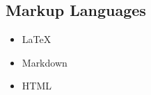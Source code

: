 \documentclass[11pt,letterpaper,sans]{moderncv}
\begin{document}
\subsection{Markup Languages}
\vspace{-10pt}
\begin{multicols}{3}
 \begin{itemize}%
  \item {\large{}\selectfont\LaTeX}\\
        \raggedright\normalsize
  \item Markdown
  \item HTML
 \end{itemize}
\end{multicols}
\vspace{-15pt}
\end{document}

